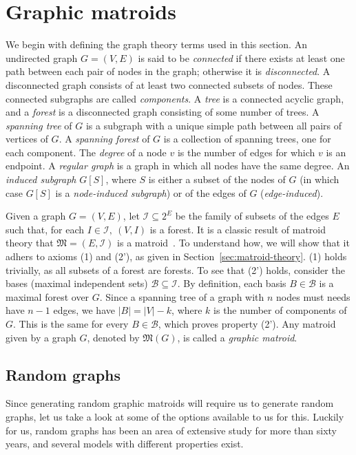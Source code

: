 \section{Graphic matroids}
We begin with defining the graph theory terms used in this section. An undirected graph $G=(V,E)$ is said to be \textit{connected} if there exists at least one path between each pair of nodes in the graph; otherwise it is \textit{disconnected}. A disconnected graph consists of at least two connected subsets of nodes. These connected subgraphs are called \textit{components}. A \textit{tree} is a connected acyclic graph, and a \textit{forest} is a disconnected graph consisting of some number of trees. A \textit{spanning tree} of $G$ is a subgraph with a unique simple path between all pairs of vertices of $G$. A \textit{spanning forest} of $G$ is a collection of spanning trees, one for each component. The \textit{degree} of a node $v$ is the number of edges for which $v$ is an endpoint. A \textit{regular graph} is a graph in which all nodes have the same degree. An \textit{induced subgraph} $G[S]$, where $S$ is either a subset of the nodes of $G$ (in which case $G[S]$ is a \textit{node-induced subgraph}) or of the edges of $G$ (\textit{edge-induced}).

Given a graph $G=(V,E)$, let $\mathcal{I} \subseteq 2^E$ be the family of subsets of the edges $E$ such that, for each $I \in \mathcal{I},\ (V, I)$ is a forest. It is a classic result of matroid theory that $\mathfrak{M} = (E, \mathcal{I})$ is a matroid~\cite[p.~657]{schrijver-2003}. To understand how, we will show that it adhers to axioms (1) and (2'), as given in Section~\ref{sec:matroid-theory}. (1) holds trivially, as all subsets of a forest are forests. To see that (2') holds, consider the bases (maximal independent sets) $\mathcal{B} \subseteq \mathcal{I}$. By definition, each basis $B \in \mathcal{B}$ is a maximal forest over $G$. Since a spanning tree of a graph with $n$ nodes must needs have $n-1$ edges, we have $|B| = |V| - k$, where $k$ is the number of components of $G$. This is the same for every $B \in \mathcal{B}$, which proves property (2'). Any matroid given by a graph $G$, denoted by $\mathfrak{M}(G)$, is called a \textit{graphic matroid}.

\subsection{Random graphs}
Since generating random graphic matroids will require us to generate random graphs, let us take a look at some of the options available to us for this. Luckily for us, random graphs has been an area of extensive study for more than sixty years, and several models with different properties exist.

